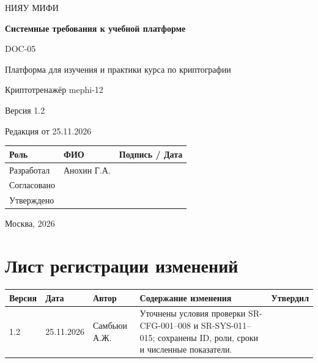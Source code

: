 \documentclass[12pt,a4paper]{article}
\begin{document}
\hypersetup{pageanchor=false}
\begin{titlepage}
  \thispagestyle{empty}
  \centering
  {\large НИЯУ МИФИ\par}
  \vspace*{3.5cm}
  {\LARGE\bfseries Системные требования к учебной платформе\par}
  \vspace{0.5cm}
  {\large DOC-05\par}
  \vspace{0.6cm}
  {\large Платформа для изучения и практики курса по криптографии\par}
  {\large Криптотренажёр mephi-12\par}
  \vspace{0.7cm}
  {\large Версия 1.2\par}
  {\large Редакция от 25.11.2026\par}
  \vspace{1cm}
  \begin{tabularx}{\textwidth}{@{}p{3.4cm}Xp{4cm}@{}}
    \toprule
    Роль & ФИО & Подпись / Дата \\
    \midrule
    Разработал & Анохин Г.А. & \\
    \addlinespace[6pt]
    Согласовано & & \\
    \addlinespace[6pt]
    Утверждено & & \\
    \bottomrule
  \end{tabularx}
  \vfill
  {\large Москва, 2026\par}
\end{titlepage}
\hypersetup{pageanchor=true}

\section*{Лист регистрации изменений}
\begingroup\small\singlespacing
\noindent
\begin{tabularx}{\textwidth}{@{}p{1.2cm}p{2cm}p{2.5cm}Xp{1.8cm}@{}}
\toprule
Версия & Дата & Автор & Содержание изменения & Утвердил \\
\midrule
1.2 & 25.11.2026 & Самбьюи А.Ж. & Уточнены условия проверки SR-CFG-001–008 и SR-SYS-011–015; сохранены ID, роли, сроки и численные показатели. & \\
\bottomrule
\end{tabularx}
\endgroup
\clearpage
\begingroup\small\singlespacing
\tableofcontents
\endgroup
\clearpage
\end{document}
